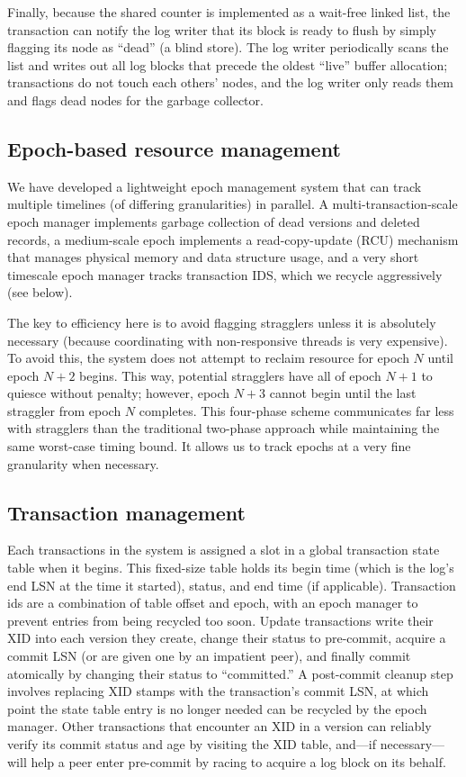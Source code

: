 Finally, because the shared counter is implemented as a wait-free linked list, the transaction can notify the log writer that its block is ready to flush by simply flagging its node as ``dead'' (a blind store). The log writer periodically scans the list and writes out all log blocks that precede the oldest ``live'' buffer allocation; transactions do not touch each others' nodes, and the log writer only reads them and flags dead nodes for the garbage collector.

\subsection{Epoch-based resource management}
We have developed a lightweight epoch management system that can track multiple timelines (of differing granularities) in parallel. A multi-transaction-scale epoch manager implements garbage collection of dead versions and deleted records, a medium-scale epoch implements a read-copy-update (RCU) mechanism that manages physical memory and data structure usage\cite{RCU}, and a very short timescale epoch manager tracks transaction IDS, which we recycle aggressively (see below).

The key to efficiency here is to avoid flagging stragglers unless it is absolutely necessary (because coordinating with non-responsive threads is very expensive). To avoid this, the system does not attempt to reclaim resource for epoch $N$ until epoch $N+2$ begins. This way, potential stragglers have all of epoch $N+1$ to quiesce without penalty; however, epoch $N+3$ cannot begin until the last straggler from epoch $N$ completes. This four-phase scheme communicates far less with stragglers than the traditional two-phase approach while maintaining the same worst-case timing bound. It allows us to track epochs at a very fine granularity when necessary. 

\subsection{Transaction management}

Each transactions in the system is assigned a slot in a global transaction state table when it begins. This fixed-size table holds its begin time (which is the log's end LSN at the time it started), status, and end time (if applicable). Transaction ids are a combination of table offset and epoch, with an epoch manager to prevent entries from being recycled too soon. Update transactions write their XID into each version they create, change their status to pre-commit, acquire a commit LSN (or are given one by an impatient peer), and finally commit atomically by changing their status to ``committed.'' A post-commit cleanup step involves replacing XID stamps with the transaction's commit LSN, at which point the state table entry is no longer needed can be recycled by the epoch manager. Other transactions that encounter an XID in a version can reliably verify its commit status and age by visiting the XID table, and---if necessary---will help a peer enter pre-commit by racing to acquire a log block on its behalf. 

